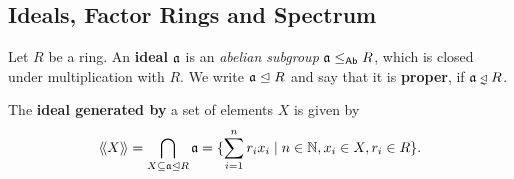 	\newpage
	\subsection{Ideals, Factor Rings and Spectrum}
	\begin{definition}
		Let $R$ be a ring. An \textbf{ideal} $\mathfrak{a}$ is an \textit{abelian subgroup} $\mathfrak{a} \leq_{\textsf{Ab}} R$, which is closed under multiplication with $R$. We write $\mathfrak{a} \trianglelefteq R$ and say that it is \textbf{proper}, if $\ideal{a} \divneq R$.

		The \textbf{ideal generated by} a set of elements $X$ is given by 
		\begin{equation*}
			\langle\!\langle X \rangle\!\rangle = \bigcap \limits_{X \subseteq \mathfrak{a} \trianglelefteq R} \mathfrak{a} = \{\sum \limits_{i=1}^n r_ix_i \mid n \in \mathbb{N}, x_i \in X, r_i \in R\}.
		\end{equation*}
	\end{definition}

